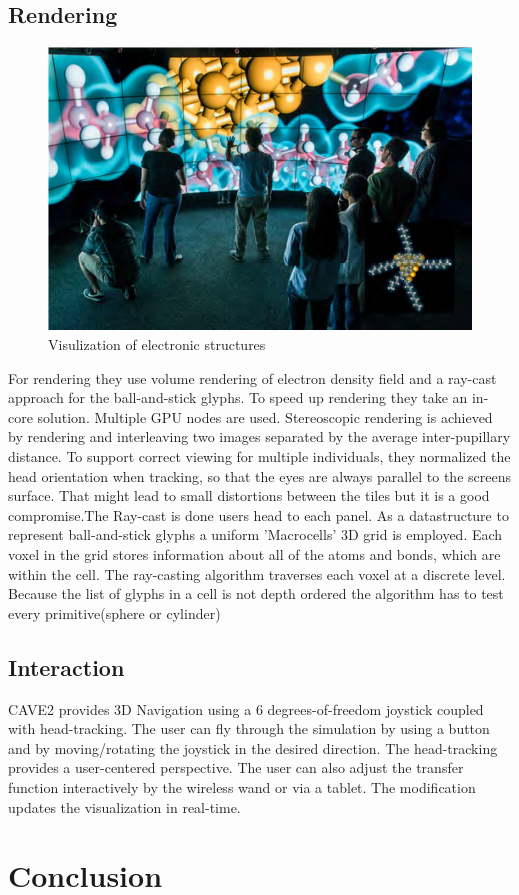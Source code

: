 \documentclass[10pt,twocolumn,letterpaper]{article}
\begin{document}
\subsection{Rendering}
\begin{figure}
	\includegraphics{atomistic_4.png}
	\caption{Visulization of electronic structures}
	\label{img:atomistic}
\end{figure}
For rendering they use volume rendering of electron density field and a ray-cast approach for the ball-and-stick glyphs. To speed up rendering they take an in-core solution. Multiple GPU nodes are used. Stereoscopic rendering is achieved by rendering and interleaving two images separated by the average inter-pupillary distance. To support correct viewing for multiple individuals, they normalized the head orientation when tracking, so that the eyes are always parallel to the screens surface. That might lead to small distortions between the tiles but it is a good compromise.The Ray-cast is done users head to each panel.
As a datastructure to represent ball-and-stick glyphs a uniform 'Macrocells' 3D grid is employed. Each voxel in the grid stores information about all of the atoms and bonds, which are within the cell.
The ray-casting algorithm \cite{Amanatides87afast} traverses each voxel at a discrete level. Because the list of glyphs in a cell is not depth ordered the algorithm has to test every primitive(sphere or cylinder) 



\subsection{Interaction}
CAVE2 provides 3D Navigation using a 6 degrees-of-freedom joystick coupled with head-tracking. The user can fly through the simulation by using a button and by moving/rotating the joystick in the desired direction. The head-tracking provides a user-centered perspective. The user can also adjust the transfer function interactively by the wireless wand or via a tablet. The modification updates the visualization in real-time.

\section{Conclusion}

{\small


}
\end{document}
